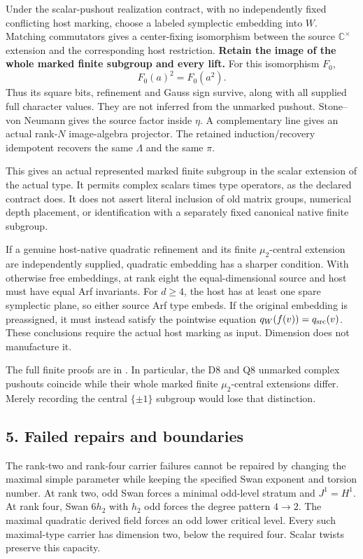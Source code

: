 Under the scalar-pushout realization contract, with no independently
fixed conflicting host marking, choose a labeled symplectic embedding
into \(W\). Matching commutators gives a center-fixing isomorphism
between the source \(\mathbb C^\times\) extension and the corresponding
host restriction. \textbf{Retain the image of the whole marked finite
subgroup and every lift.} For this isomorphism \(F_0\), \[
F_0(a)^2=F_0(a^2).
\] Thus its square bits, refinement and Gauss sign survive, along with
all supplied full character values. They are not inferred from the
unmarked pushout. Stone--von Neumann gives the source factor inside
\(\eta\). A complementary line gives an actual rank-\(N\) image-algebra
projector. The retained induction/recovery idempotent recovers the same
\(\Lambda\) and the same \(\pi\).

This gives an actual represented marked finite subgroup in the scalar
extension of the actual type. It permits complex scalars times type
operators, as the declared contract does. It does not assert literal
inclusion of old matrix groups, numerical depth placement, or
identification with a separately fixed canonical native finite subgroup.

If a genuine host-native quadratic refinement and its finite
\(\mu_2\)-central extension are independently supplied, quadratic
embedding has a sharper condition. With otherwise free embeddings, at
rank eight the equal-dimensional source and host must have equal Arf
invariants. For \(d\ge4\), the host has at least one spare symplectic
plane, so either source Arf type embeds. If the original embedding is
preassigned, it must instead satisfy the pointwise equation
\(q_W(f(v))=q_{\rm src}(v)\). These conclusions require the actual host
marking as input. Dimension does not manufacture it.

The full finite proofs are in .
In particular, the D8 and Q8 unmarked complex pushouts coincide while
their whole marked finite \(\mu_2\)-central extensions differ. Merely
recording the central \(\{\pm1\}\) subgroup would lose that distinction.

\hypertarget{dyadic_synthesis-failed-repairs-and-boundaries}{%
\subsection{5. Failed repairs and
boundaries}\label{dyadic_synthesis-failed-repairs-and-boundaries}}

The rank-two and rank-four carrier failures cannot be repaired by
changing the maximal simple parameter while keeping the specified Swan
exponent and torsion number. At rank two, odd Swan forces a minimal
odd-level stratum and \(J^1=H^1\). At rank four, Swan \(6h_2\) with
\(h_2\) odd forces the degree pattern \(4\to2\). The maximal quadratic derived field forces an odd lower critical level. Every such
maximal-type carrier has dimension two, below the required four. Scalar
twists preserve this capacity.

